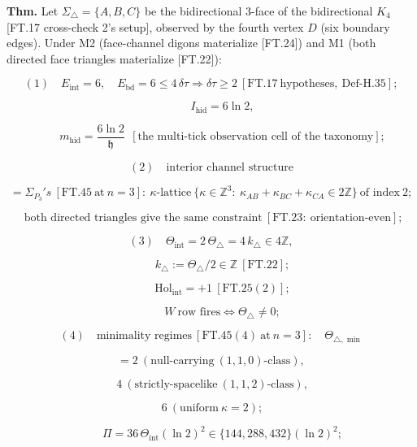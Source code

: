 \begin{theorem}\label{tag:FT-49}
\textbf{Thm.} Let $\Sigma_{\triangle}=\{A,B,C\}$ be the bidirectional 3-face of the bidirectional $K_4$ [FT.17 cross-check 2's setup], observed by the fourth vertex $D$ (six boundary edges). Under M2 (face-channel digons materialize [FT.24]) and M1 (both directed face triangles materialize [FT.22]):

\[
(1)\quad E_{\mathrm{int}}=6,\quad E_{\mathrm{bd}}=6\le4\,\delta\tau\Rightarrow\delta\tau\ge2\ [\mathrm{FT.17}\ \text{hypotheses},\ \text{Def-H.35}];
\]

\[
\qquad I_{\mathrm{hid}}=6\ln2,
\]

\[
\qquad m_{\mathrm{hid}}=\frac{6\ln2}{\mathfrak h}\ \ [\text{the multi-tick observation cell of the taxonomy}];
\]

\[
(2)\quad\text{interior channel structure}
\]

\[
= \Sigma_{P_3}'s\ [\mathrm{FT.45}\ \text{at}\ n{=}3]:\ \kappa\text{-lattice}\ \{\kappa\in\mathbb Z^3:\ \kappa_{AB}{+}\kappa_{BC}{+}\kappa_{CA}\in2\mathbb Z\}\ \text{of index}\ 2;
\]

\[
\ \ \text{both directed triangles give the same constraint}\ [\mathrm{FT.23}:\ \text{orientation-even}];
\]

\[
(3)\quad\Theta_{\mathrm{int}}=2\,\Theta_{\triangle}=4\,k_{\triangle}\in4\mathbb Z,
\]

\[
\qquad k_{\triangle}:=\Theta_{\triangle}/2\in\mathbb Z\ [\mathrm{FT.22}];
\]

\[
\qquad \mathrm{Hol}_{\mathrm{int}}=+1\ [\mathrm{FT.25}(2)];
\]

\[
\qquad W\ \text{row fires}\iff\Theta_{\triangle}\ne0;
\]

\[
(4)\quad\text{minimality regimes}\ [\mathrm{FT.45}(4)\ \text{at}\ n{=}3]:\quad\Theta_{\triangle,\min}
\]

\[
= 2\ (\text{null-carrying}\ (1,1,0)\text{-class}),
\]

\[
\ 4\ (\text{strictly-spacelike}\ (1,1,2)\text{-class}),
\]

\[
\ 6\ (\text{uniform}\ \kappa{=}2);
\]

\[
\qquad \Pi=36\,\Theta_{\mathrm{int}}(\ln2)^2\in\{144,288,432\}(\ln2)^2;
\]


\end{theorem}
